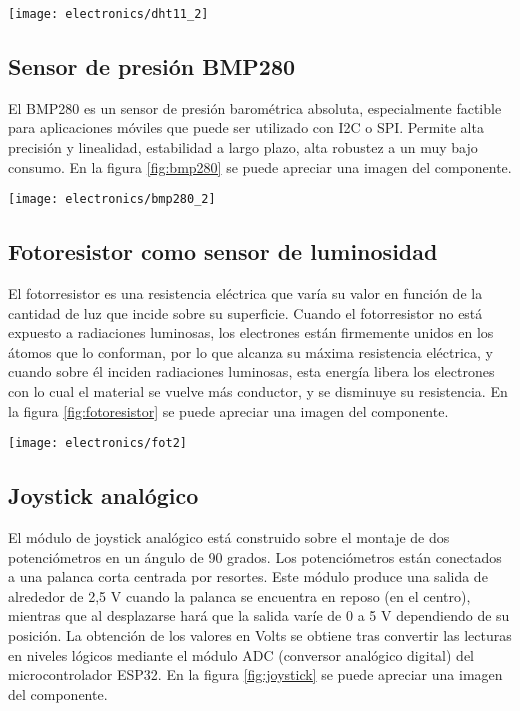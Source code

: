 \begin{center}
   \texttt{[image: electronics/dht11\_2]}
   \label{fig:dht11}
\end{center}

\subsection{Sensor de presión BMP280}

El BMP280 \cite{BMP280_datasheet} es un sensor de presión barométrica absoluta, especialmente factible para aplicaciones móviles que puede ser utilizado con I2C o SPI. Permite alta precisión y linealidad, estabilidad a largo plazo, alta robustez a un muy bajo consumo. En la figura \ref{fig:bmp280} se puede apreciar una imagen del componente.

\begin{center}
   \texttt{[image: electronics/bmp280\_2]}
   \label{fig:bmp280}
\end{center}

\subsection{Fotoresistor como sensor de luminosidad}

El fotorresistor es una resistencia eléctrica que varía su valor en función de la cantidad de luz que incide sobre su superficie.
Cuando el fotorresistor no está expuesto a radiaciones luminosas, los electrones están firmemente unidos en los átomos que lo conforman, por lo que alcanza su máxima resistencia eléctrica, y cuando sobre él inciden radiaciones luminosas, esta energía libera los electrones con lo cual el material se vuelve más conductor, y se disminuye su resistencia. En la figura \ref{fig:fotoresistor} se puede apreciar una imagen del componente.

\begin{center}
   \texttt{[image: electronics/fot2]}
   \label{fig:fotoresistor}
\end{center}


\subsection{Joystick analógico}
El módulo de joystick analógico \cite{analog_joystick_datasheet} está construido sobre el montaje de dos potenciómetros en un ángulo de 90 grados. Los potenciómetros están conectados a una palanca corta centrada por resortes.
Este módulo produce una salida de alrededor de 2,5 V cuando la palanca se encuentra en reposo (en el centro), mientras que al desplazarse hará que la salida varíe de 0 a 5 V dependiendo de su posición. La obtención de los valores en Volts se obtiene tras convertir las lecturas en niveles lógicos mediante el módulo ADC (conversor analógico digital) \cite{ESP32_adc} del microcontrolador ESP32. En la figura \ref{fig:joystick} se puede apreciar una imagen del componente.

